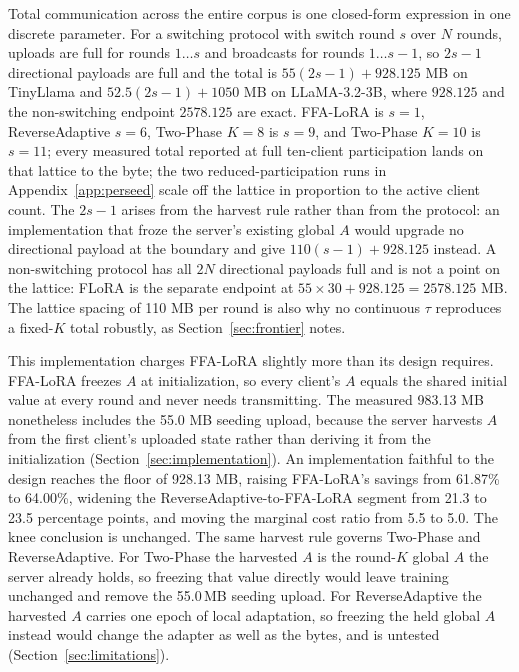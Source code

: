 Total communication across the entire corpus is one closed-form expression in one discrete parameter. For a switching protocol with switch round $s$ over $N$ rounds, uploads are full for rounds $1 \ldots s$ and broadcasts for rounds $1 \ldots s{-}1$, so $2s-1$ directional payloads are full and the total is $55(2s-1) + 928.125$ MB on TinyLlama and $52.5(2s-1) + 1050$ MB on LLaMA-3.2-3B, where $928.125$ and the non-switching endpoint $2578.125$ are exact. FFA-LoRA is $s{=}1$, ReverseAdaptive $s{=}6$, Two-Phase $K{=}8$ is $s{=}9$, and Two-Phase $K{=}10$ is $s{=}11$; every measured total reported at full ten-client participation lands on that lattice to the byte; the two reduced-participation runs in Appendix~\ref{app:perseed} scale off the lattice in proportion to the active client count. The $2s-1$ arises from the harvest rule rather than from the protocol: an implementation that froze the server's existing global $A$ would upgrade no directional payload at the boundary and give $110(s-1) + 928.125$ instead. A non-switching protocol has all $2N$ directional payloads full and is not a point on the lattice: FLoRA is the separate endpoint at $55 \times 30 + 928.125 = 2578.125$ MB. The lattice spacing of 110 MB per round is also why no continuous $\tau$ reproduces a fixed-$K$ total robustly, as Section~\ref{sec:frontier} notes.

This implementation charges FFA-LoRA slightly more than its design requires. FFA-LoRA freezes $A$ at initialization, so every client's $A$ equals the shared initial value at every round and never needs transmitting. The measured 983.13 MB nonetheless includes the 55.0 MB seeding upload, because the server harvests $A$ from the first client's uploaded state rather than deriving it from the initialization (Section~\ref{sec:implementation}). An implementation faithful to the design reaches the floor of 928.13 MB, raising FFA-LoRA's savings from 61.87\% to 64.00\%, widening the ReverseAdaptive-to-FFA-LoRA segment from 21.3 to 23.5 percentage points, and moving the marginal cost ratio from 5.5 to 5.0. The knee conclusion is unchanged. The same harvest rule governs Two-Phase and ReverseAdaptive. For Two-Phase the harvested $A$ is the round-$K$ global $A$ the server already holds, so freezing that value directly would leave training unchanged and remove the 55.0\,MB seeding upload. For ReverseAdaptive the harvested $A$ carries one epoch of local adaptation, so freezing the held global $A$ instead would change the adapter as well as the bytes, and is untested (Section~\ref{sec:limitations}).


